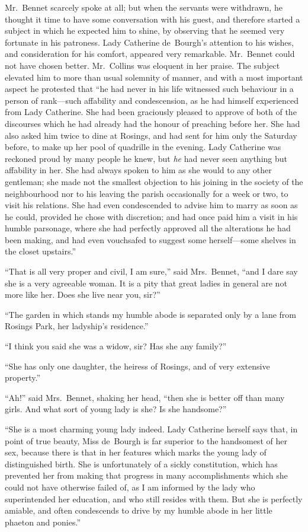  Mr.\ Bennet scarcely spoke at all; but when the
servants were withdrawn, he thought it time to have some
conversation with his guest, and therefore started a subject in
which he expected him to shine, by observing that he seemed
very fortunate in his patroness.  Lady Catherine de~Bourgh's
attention to his wishes, and consideration for his comfort,
appeared very remarkable.  Mr.\ Bennet could not have chosen
better.  Mr.\ Collins was eloquent in her praise.  The subject
elevated him to more than usual solemnity of manner, and with a
most important aspect he protested that ``he had never in his life
witnessed such behaviour in a person of rank---such affability
and condescension, as he had himself experienced from Lady
Catherine.  She had been graciously pleased to approve of both
of the discourses which he had already had the honour of
preaching before her.  She had also asked him twice to dine at
Rosings, and had sent for him only the Saturday before, to make
up her pool of quadrille in the evening.  Lady Catherine was
reckoned proud by many people he knew, but \emph{he} had never
seen anything but affability in her.  She had always spoken to
him as she would to any other gentleman; she made not the
smallest objection to his joining in the society of the
neighbourhood nor to his leaving the parish occasionally for a
week or two, to visit his relations.  She had even condescended
to advise him to marry as soon as he could, provided he chose
with discretion; and had once paid him a visit in his humble
parsonage, where she had perfectly approved all the alterations
he had been making, and had even vouchsafed to suggest some
herself---some shelves in the closet upstairs.''

``That is all very proper and civil, I am sure,'' said Mrs.\ Bennet,
``and I dare say she is a very agreeable woman.  It is a pity that
great ladies in general are not more like her.  Does she live near
you, sir?''

``The garden in which stands my humble abode is separated only
by a lane from Rosings Park, her ladyship's residence.''

``I think you said she was a widow, sir?  Has she any family?''

``She has only one daughter, the heiress of Rosings, and of very
extensive property.''

``Ah!'' said Mrs.\ Bennet, shaking her head, ``then she is better off
than many girls.  And what sort of young lady is she?  Is she
handsome?''

``She is a most charming young lady indeed.  Lady Catherine
herself says that, in point of true beauty, Miss de~Bourgh is far
superior to the handsomest of her sex, because there is that in
her features which marks the young lady of distinguished birth.
She is unfortunately of a sickly constitution, which has prevented
her from making that progress in many accomplishments which
she could not have otherwise failed of, as I am informed by the
lady who superintended her education, and who still resides with
them.  But she is perfectly amiable, and often condescends to
drive by my humble abode in her little phaeton and ponies.''

